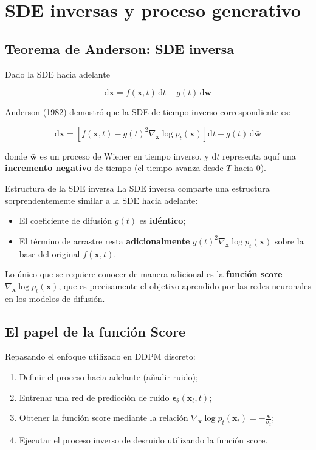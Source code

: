 \section{SDE inversas y proceso generativo}

\subsection{Teorema de Anderson: SDE inversa}

Dado la SDE hacia adelante

$$
\mathrm{d}\mathbf{x} = f(\mathbf{x}, t)\,\mathrm{d}t + g(t)\,\mathrm{d}\mathbf{w}
$$

Anderson (1982) demostró que la SDE de tiempo inverso correspondiente es:

$$
\mathrm{d}\mathbf{x} = \left[f(\mathbf{x}, t) - g(t)^2 \nabla_{\mathbf{x}} \log p_t(\mathbf{x})\right]\mathrm{d}t + g(t)\,\mathrm{d}\bar{\mathbf{w}}
$$

donde $\bar{\mathbf{w}}$ es un proceso de Wiener en tiempo inverso, y $\mathrm{d}t$ representa aquí una \textbf{incremento negativo} de tiempo (el tiempo avanza desde $T$ hacia 0).

\begin{importantbox}{Estructura de la SDE inversa}
La SDE inversa comparte una estructura sorprendentemente similar a la SDE hacia adelante:
\begin{itemize}
    \item El coeficiente de difusión $g(t)$ es \textbf{idéntico};
    \item El término de arrastre resta \textbf{adicionalmente} $g(t)^2 \nabla_{\mathbf{x}} \log p_t(\mathbf{x})$ sobre la base del original $f(\mathbf{x}, t)$.
\end{itemize}
Lo único que se requiere conocer de manera adicional es la \textbf{función score} $\nabla_{\mathbf{x}} \log p_t(\mathbf{x})$, que es precisamente el objetivo aprendido por las redes neuronales en los modelos de difusión.
\end{importantbox}

\subsection{El papel de la función Score}

Repasando el enfoque utilizado en DDPM discreto:
\begin{enumerate}
    \item Definir el proceso hacia adelante (añadir ruido);
    \item Entrenar una red de predicción de ruido $\boldsymbol{\epsilon}_\theta(\mathbf{x}_t, t)$;
    \item Obtener la función score mediante la relación $\nabla_{\mathbf{x}} \log p_t(\mathbf{x}_t) = -\frac{\boldsymbol{\epsilon}}{\sigma_t}$;
    \item Ejecutar el proceso inverso de desruido utilizando la función score.
\end{enumerate}

